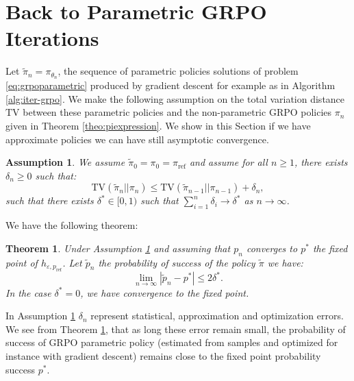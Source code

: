\documentclass[11pt,reqno]{amsart}
\newtheorem{theorem}{Theorem}
\newtheorem{assumption}{Assumption}
\begin{document}
\section{Back to Parametric GRPO Iterations}\label{sec:approx}

Let $\tilde{\pi}_n = \pi_{\theta_n}$, the sequence of parametric policies solutions of problem \eqref{eq:grpoparametric} produced by gradient descent for example as in Algorithm \ref{alg:iter-grpo}.  We make the following assumption on the total variation distance $\mathrm{TV}$ between  these parametric policies and the non-parametric GRPO policies $\pi_{n}$ given in Theorem \ref{theo:piexpression}. We show in this Section if we have approximate policies we can have still asymptotic convergence.

\begin{assumption} We assume $\tilde{\pi}_0= \pi_0 = \pi_{\mathrm{ref}}$ and assume for all $n\geq 1$, there exists $\delta_{n}\geq 0$ such that:
\[\mathrm{TV} (\tilde{\pi}_n  || \pi_n ) \leq \mathrm{TV} (\tilde{\pi}_{n-1}  || \pi_{n-1} ) + \delta_n,\]
such  that there exists $\delta^* \in [0,1)$ such that $\sum_{i=1}^n \delta_i \to \delta^* $ as $n \to \infty$. 
\label{ass:conv}
\end{assumption}

We have the following theorem:

\begin{theorem} Under Assumption \ref{ass:conv} and assuming that $p_{n}$ converges to $p^*$ the fixed point of  $h_{\varepsilon, p_{\mathrm{ref}}}$. Let $\tilde{p}_n$ the probability of success of the policy $\tilde{\pi}$ we have: 
\[\lim_{n\to \infty} | \tilde{p}_n -p^*|\leq 2 \delta^*.\]
In the case $\delta^*=0$, we have convergence to the fixed point.
\label{theo:convparametric}
\end{theorem}

In Assumption \ref{ass:conv} $\delta_n$ represent statistical, approximation and optimization errors. We see from Theorem \ref{theo:convparametric}, that  as long these error remain small, the probability of success of GRPO  parametric policy (estimated from samples and optimized for instance with gradient descent)  remains close to the fixed point probability success $p^*$.
\end{document}
